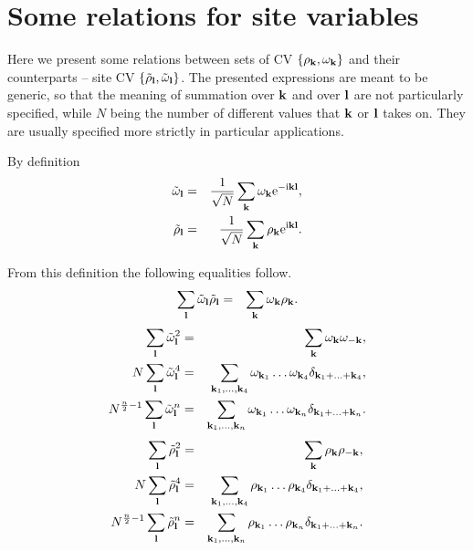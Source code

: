 \section{\label{sec:app-b} Some relations for site variables}

Here we present some relations between sets of CV $\{\rho_{\vb k}, \omega_{\vb k}\}$ and their counterparts -- site CV $\{\tilde{\rho}_{\vb l}, \tilde{\omega}_{\vb l}\}$. The presented expressions are meant to be generic, so that the meaning of summation over $\vb k$ and over $\vb l$ are not particularly specified, while $N$ being the number of different values that $\vb k$ or $\vb l$ takes on. They are usually specified more strictly in particular applications.

By definition
\begin{eqnarray*}
	\tilde{\omega}_{\vb l} & = & \frac{1}{\sqrt{N}} \sum_{\vb k} \omega_{\vb k} {\rm e}^{-{\rm i}{\vb k}{\vb l}},
\\
	\tilde{\rho}_{\vb l} & = & \frac{1}{\sqrt{N}} \sum_{\vb k} \rho_{\vb k} {\rm e}^{{\rm i} {\vb k} {\vb l}}.
\end{eqnarray*}

From this definition the following equalities follow.
\begin{eqnarray*}
	\sum_{\vb l} \tilde{\omega}_{\vb l} \tilde{\rho}_{\vb l} & = & \sum_{\vb k} \omega_{\vb k} \rho_{\vb k}.
\end{eqnarray*}
\begin{eqnarray*}
	\sum_{\vb l} \tilde{\omega}_{\vb l}^2 & = & \sum_{\vb k} \omega_{\vb k} \omega_{-\vb k},
\\
	N \sum_{\vb l} \tilde{\omega}_{\vb l}^4 & = & \sum_{\vb k_1, \dotsc, \vb k_4} \omega_{\vb k_1} \dotsc \omega_{\vb k_4} \delta_{\vb{k}_1 + \dotsc + \vb{k}_4},
\\
	N^{\frac{n}{2} - 1} \sum_{\vb l} \tilde{\omega}_{\vb l}^n & = &  \sum_{\vb k_1, \dotsc, \vb k_n} \omega_{\vb k_1} \dotsc \omega_{\vb k_n} \delta_{\vb{k}_1 + \dotsc + \vb{k}_n}.
\end{eqnarray*}
\begin{eqnarray*}
	\sum_{\vb l} \tilde{\rho}_{\vb l}^2 & = & \sum_{\vb k} \rho_{\vb k} \rho_{-\vb k},
\\
	N \sum_{\vb l} \tilde{\rho}_{\vb l}^4 & = & \sum_{\vb k_1, \dotsc, \vb k_4} \rho_{\vb k_1} \dotsc \rho_{\vb k_4} \delta_{\vb{k}_1 + \dotsc + \vb{k}_4},
\\
	N^{\frac{n}{2} - 1} \sum_{\vb l} \tilde{\rho}_{\vb l}^n & = & \sum_{\vb k_1, \dotsc, \vb k_n} \rho_{\vb k_1} \dotsc \rho_{\vb k_n} \delta_{\vb{k}_1 + \dotsc + \vb{k}_n}.
\end{eqnarray*}